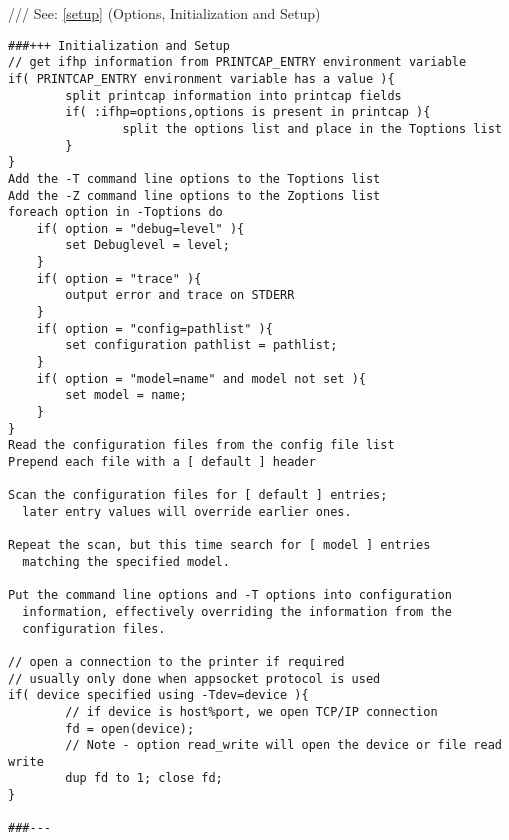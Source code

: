 \documentclass[a4paper]{article}
\begin{document}
{\ttfamily ///} See: \ref{setup} {(Options, Initialization and Setup)}
\begin{tscreen}
\begin{verbatim}
###+++ Initialization and Setup
// get ifhp information from PRINTCAP_ENTRY environment variable
if( PRINTCAP_ENTRY environment variable has a value ){
        split printcap information into printcap fields
        if( :ifhp=options,options is present in printcap ){
                split the options list and place in the Toptions list
        }
}
Add the -T command line options to the Toptions list
Add the -Z command line options to the Zoptions list
foreach option in -Toptions do
    if( option = "debug=level" ){
        set Debuglevel = level;
    }
    if( option = "trace" ){
        output error and trace on STDERR
    }
    if( option = "config=pathlist" ){
        set configuration pathlist = pathlist;
    }
    if( option = "model=name" and model not set ){
        set model = name;
    }
}
Read the configuration files from the config file list
Prepend each file with a [ default ] header

Scan the configuration files for [ default ] entries;
  later entry values will override earlier ones.

Repeat the scan, but this time search for [ model ] entries
  matching the specified model.

Put the command line options and -T options into configuration
  information, effectively overriding the information from the
  configuration files.

// open a connection to the printer if required
// usually only done when appsocket protocol is used
if( device specified using -Tdev=device ){
        // if device is host%port, we open TCP/IP connection
        fd = open(device);
        // Note - option read_write will open the device or file read write
        dup fd to 1; close fd;
}

###---
\end{verbatim}
\end{tscreen}
\end{document}

